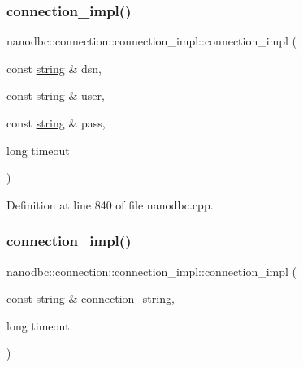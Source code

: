 \subsubsection{\texorpdfstring{connection\_impl()}{connection\_impl()}\hspace{0.1cm}{\footnotesize\ttfamily [3/4]}}
{\footnotesize\ttfamily nanodbc\+::connection\+::connection\+\_\+impl\+::connection\+\_\+impl (\begin{DoxyParamCaption}\item[{const \mbox{\hyperlink{namespacenanodbc_abfc0ece56278e590911ec8352774c212}{string}} \&}]{dsn,  }\item[{const \mbox{\hyperlink{namespacenanodbc_abfc0ece56278e590911ec8352774c212}{string}} \&}]{user,  }\item[{const \mbox{\hyperlink{namespacenanodbc_abfc0ece56278e590911ec8352774c212}{string}} \&}]{pass,  }\item[{long}]{timeout }\end{DoxyParamCaption})\hspace{0.3cm}{\ttfamily [inline]}}



Definition at line 840 of file nanodbc.\+cpp.

\mbox{\label{classnanodbc_1_1connection_1_1connection__impl_aa31978244f856c21d74e182c5ffebc1a}} 
\subsubsection{\texorpdfstring{connection\_impl()}{connection\_impl()}\hspace{0.1cm}{\footnotesize\ttfamily [4/4]}}
{\footnotesize\ttfamily nanodbc\+::connection\+::connection\+\_\+impl\+::connection\+\_\+impl (\begin{DoxyParamCaption}\item[{const \mbox{\hyperlink{namespacenanodbc_abfc0ece56278e590911ec8352774c212}{string}} \&}]{connection\+\_\+string,  }\item[{long}]{timeout }\end{DoxyParamCaption})\hspace{0.3cm}{\ttfamily [inline]}}



